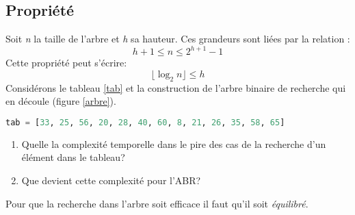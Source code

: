 \documentclass[a4paper,11pt]{article}
\begin{document}
\subsection{Propriété}
Soit \emph{n} la taille de l'arbre et \emph{h} sa hauteur. Ces grandeurs sont liées par la relation :
$$h+1 \leq n \leq 2^{h+1}-1$$
Cette propriété peut s'écrire:
$$ \lfloor \log_2 n  \rfloor \leq h$$
Considérons le tableau \ref{tab} et la construction de l'arbre binaire de recherche qui en découle (figure \ref{arbre}).
\begin{center}
    \begin{lstlisting}[language=Python]
tab = [33, 25, 56, 20, 28, 40, 60, 8, 21, 26, 35, 58, 65]
\end{lstlisting}
    \label{tab}
\end{center}

\begin{activite}
    \begin{enumerate}
        \item Quelle la complexité temporelle dans le pire des cas de la recherche d'un élément dans le tableau?
        \item Que devient cette complexité pour l'ABR?
    \end{enumerate}
\end{activite}
\begin{aretenir}[Remarque]
    Pour que la recherche dans l'arbre soit efficace il faut qu'il soit \emph{équilibré}.
\end{aretenir}
\end{document}
